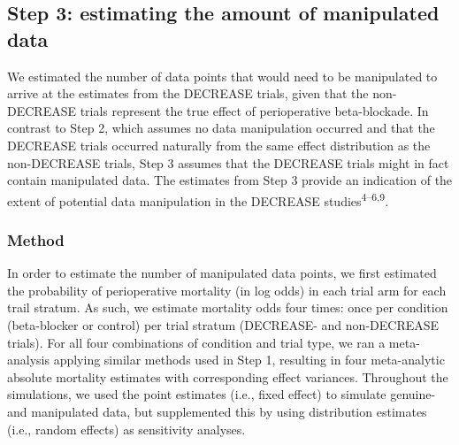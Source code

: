 \documentclass[]{article}
\begin{document}
\subsection{Step 3: estimating the amount of manipulated
data}\label{step-3-estimating-the-amount-of-manipulated-data}

We estimated the number of data points that would need to be manipulated
to arrive at the estimates from the DECREASE trials, given that the
non-DECREASE trials represent the true effect of perioperative
beta-blockade. In contrast to Step 2, which assumes no data manipulation
occurred and that the DECREASE trials occurred naturally from the same
effect distribution as the non-DECREASE trials, Step 3 assumes that the
DECREASE trials might in fact contain manipulated data. The estimates
from Step 3 provide an indication of the extent of potential data
manipulation in the DECREASE studies\textsuperscript{4--6,9}.

\subsubsection{Method}\label{method-1}

In order to estimate the number of manipulated data points, we first
estimated the probability of perioperative mortality (in log odds) in
each trial arm for each trail stratum. As such, we estimate mortality
odds four times: once per condition (beta-blocker or control) per trial
stratum (DECREASE- and non-DECREASE trials). For all four combinations
of condition and trial type, we ran a meta-analysis applying similar
methods used in Step 1, resulting in four meta-analytic absolute
mortality estimates with corresponding effect variances. Throughout the
simulations, we used the point estimates (i.e., fixed effect) to
simulate genuine- and manipulated data, but supplemented this by using
distribution estimates (i.e., random effects) as sensitivity analyses.
\end{document}
